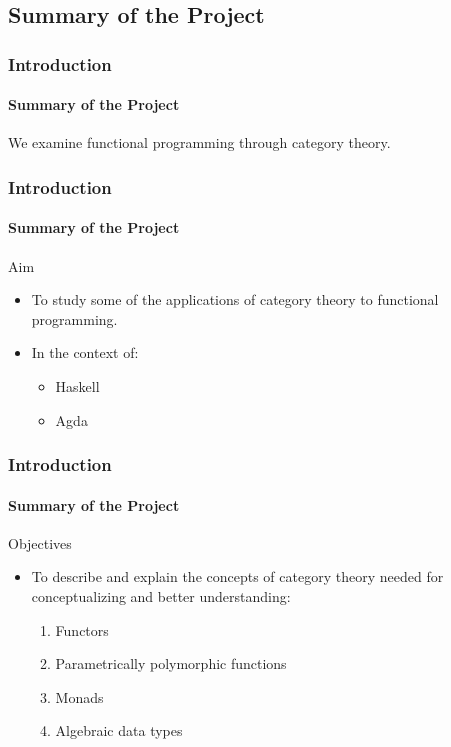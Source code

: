 \documentclass{beamer}
\begin{document}

\subsection[Summary]{Summary of the Project}


\begin{frame}
  \frametitle{Introduction}
  \framesubtitle{Summary of the Project}

  We examine functional programming through category theory.

\end{frame}


\begin{frame}[label={aim}]
  \frametitle{Introduction}
  \framesubtitle{Summary of the Project}

  \begin{block}{Aim}
    \begin{itemize}
    \item
      To study some of the applications of category theory to
      functional programming.
    \item
      In the context of:
      \begin{itemize}
      \item
        Haskell
      \item
        Agda
      \end{itemize}
    \end{itemize}
  \end{block}

\end{frame}


\begin{frame}[label={objectives}]
  \frametitle{Introduction}
  \framesubtitle{Summary of the Project}

  \begin{block}{Objectives}
    \begin{itemize}
    \item
      To describe and explain the concepts of category theory needed
      for conceptualizing and better understanding:
      \begin{enumerate}
      \item
        Functors
      \item
        Parametrically polymorphic functions
      \item
        Monads
      \item
        Algebraic data types
      \end{enumerate}
    \end{itemize}
  \end{block}

\end{frame}
\end{document}
